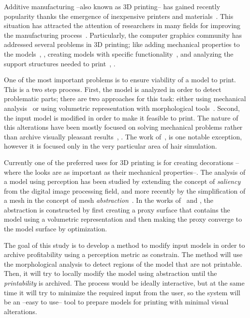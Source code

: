 Additive manufacturing --also known as 3D printing-- has gained recently popularity thanks the emergence of inexpensive printers and materials~\cite{Oropallo2015}. This situation has attracted the attention of researchers in many fields for improving the manufacturing process~\cite{Gao2015}. Particularly, the computer graphics community has addressed several problems in 3D printing; like adding mechanical properties to the models~\cite{Li2015}, \cite{Panetta2015}, creating models with specific functionality~\cite{Song2015}, \cite{Bacher2014} and analyzing the support structures needed to print~\cite{Vanek2014}, \cite{Hu2016}. 

One of the most important problems is to ensure viability of a model to print. This is a two step process. First, the model is analyzed in order to detect problematic parts; there are two approaches for this task: either using mechanical analysis~\cite{Stava2012} or using volumetric representation with morphological tools~\cite{Telea2011}. Second, the input model is modified in order to make it feasible to print. The nature of this alterations have been mostly focused on solving mechanical problems rather than archive visually pleasant results~\cite{Lu2014}, \cite{Zhou2013}. The work of~\cite{Echevarria2014}, is one notable exception, however it is focused only in the very particular area of hair simulation.

Currently one of the preferred uses for 3D printing is for creating decorations --where the looks are as important as their mechanical properties--. The analysis of a model using perception has been studied by extending the concept of \emph{saliency}~\cite{Wang2015} from the digital image processing field, and more recently by the simplification of a mesh in the concept of mesh \emph{abstraction}~\cite{DeGoes2011}. In the works of~\cite{Mehra2009} and \cite{Yumer2012}, the abstraction is constructed by first creating a proxy surface that contains the model using a volumetric representation and then making the proxy converge to the model surface by optimization.

The goal of this study is to develop a method to modify input models in order to archive profitability using a perception metric as constrain. The method will use the morphological analysis to detect regions of the model that are not printable. Then, it will try to locally modify the model using abstraction until the \emph{printability} is archived. The process would be ideally interactive, but at the same time it will try to minimize the required input from the user, so the system will be an --easy to use-- tool to prepare models for printing with minimal visual alterations.
